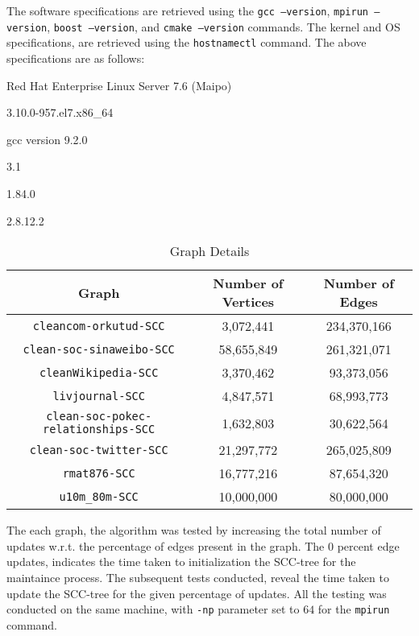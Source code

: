 The software specifications are retrieved using the \texttt{gcc --version}, \texttt{mpirun --version}, \texttt{boost --version}, and \texttt{cmake --version} commands.
The kernel and OS specifications, are retrieved using the \texttt{hostnamectl} command. The above specifications are as follows:
\begin{description}[font=\sffamily\bfseries\small,itemsep=0pt,parsep=0pt]
    \item[Operating System:] Red Hat Enterprise Linux Server 7.6 (Maipo)
    \item[Kernel:] 3.10.0-957.el7.x86\_64
    \item[Compiler:] gcc version 9.2.0
    \item[OpenMPI:] 3.1
    \item[Boost:] 1.84.0
    \item[CMake:] 2.8.12.2
\end{description}

\begin{table}[H]
    \centering
    \caption{Graph Details}
    \begin{tabular}{|c|c|c|}
        \hline
        \textbf{Graph} & \textbf{Number of Vertices} & \textbf{Number of Edges} \\
        \hline
        \texttt{cleancom-orkutud-SCC} & 3,072,441 & 234,370,166 \\
        \texttt{clean-soc-sinaweibo-SCC} & 58,655,849 & 261,321,071 \\
        \texttt{cleanWikipedia-SCC} & 3,370,462 & 93,373,056 \\
        \texttt{livjournal-SCC} & 4,847,571 & 68,993,773 \\
        \texttt{clean-soc-pokec-relationships-SCC} & 1,632,803 & 30,622,564 \\
        \texttt{clean-soc-twitter-SCC} & 21,297,772 & 265,025,809 \\
        \texttt{rmat876-SCC} & 16,777,216 & 87,654,320 \\
        \texttt{u10m\_80m-SCC} & 10,000,000 & 80,000,000 \\
        \hline
    \end{tabular}
    \label{tab:graph_details}
\end{table}

The each graph, the algorithm was tested by increasing the total number of updates w.r.t. the percentage of edges present in the graph. 
The $0$ percent edge updates, indicates the time taken to initialization the SCC-tree for the maintaince process. 
The subsequent tests conducted, reveal the time taken to update the SCC-tree for the given percentage of updates. 
All the testing was conducted on the same machine, with \texttt{-np} parameter set to $64$ for the \texttt{mpirun} command.


